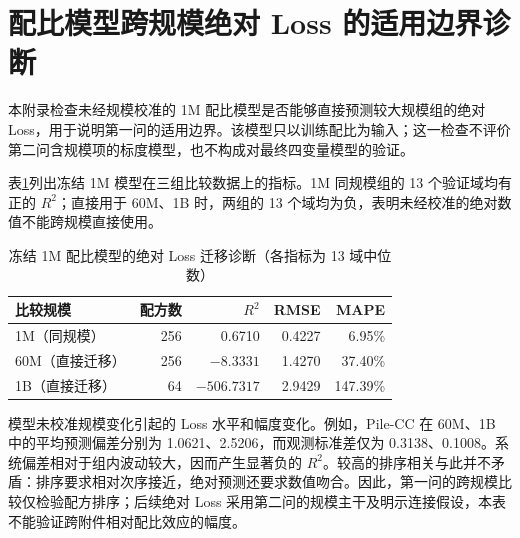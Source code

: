 \clearpage
\section{配比模型跨规模绝对 Loss 的适用边界诊断}
\label{sec:appendix-q1-transfer}
\setcounter{table}{0}
\setcounter{equation}{0}
\setcounter{figure}{0}

本附录检查未经规模校准的 1M 配比模型是否能够直接预测较大规模组的绝对 Loss，用于说明第一问的适用边界。该模型只以训练配比为输入；这一检查不评价第二问含规模项的标度模型，也不构成对最终四变量模型的验证。

表\ref{tab:q1-r2-transfer}列出冻结 1M 模型在三组比较数据上的指标。1M 同规模组的 13 个验证域均有正的 $R^2$；直接用于 60M、1B 时，两组的 13 个域均为负，表明未经校准的绝对数值不能跨规模直接使用。

\begin{table}[htbp]
 \centering\small
 \caption{冻结 1M 配比模型的绝对 Loss 迁移诊断（各指标为 13 域中位数）}
 \label{tab:q1-r2-transfer}
 \begin{tabular}{lrrrr}
 \toprule
 比较规模 & 配方数 & $R^2$ & RMSE & MAPE\\
 \midrule
 1M（同规模） & 256 & 0.6710 & 0.4227 & 6.95\%\\
 60M（直接迁移） & 256 & $-8.3331$ & 1.4270 & 37.40\%\\
 1B（直接迁移） & 64 & $-506.7317$ & 2.9429 & 147.39\%\\
 \bottomrule
 \end{tabular}
\end{table}

模型未校准规模变化引起的 Loss 水平和幅度变化。例如，Pile-CC 在 60M、1B 中的平均预测偏差分别为 1.0621、2.5206，而观测标准差仅为 0.3138、0.1008。系统偏差相对于组内波动较大，因而产生显著负的 $R^2$。较高的排序相关与此并不矛盾：排序要求相对次序接近，绝对预测还要求数值吻合。因此，第一问的跨规模比较仅检验配方排序；后续绝对 Loss 采用第二问的规模主干及明示连接假设，本表不能验证跨附件相对配比效应的幅度。
